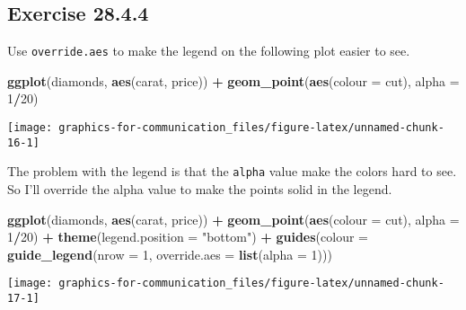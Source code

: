 \documentclass[]{book}
\newenvironment{Shaded}{\begin{snugshade}}{\end{snugshade}}
\newcommand{\DataTypeTok}[1]{\textcolor[rgb]{0.13,0.29,0.53}{#1}}
\newcommand{\DecValTok}[1]{\textcolor[rgb]{0.00,0.00,0.81}{#1}}
\newcommand{\KeywordTok}[1]{\textcolor[rgb]{0.13,0.29,0.53}{\textbf{#1}}}
\newcommand{\NormalTok}[1]{#1}
\newcommand{\OperatorTok}[1]{\textcolor[rgb]{0.81,0.36,0.00}{\textbf{#1}}}
\newcommand{\StringTok}[1]{\textcolor[rgb]{0.31,0.60,0.02}{#1}}
\theoremstyle{plain}
\theoremstyle{remark}
\theoremstyle{definition}
\theoremstyle{definition}
\theoremstyle{definition}
\theoremstyle{remark}
\begin{document}
\hypertarget{exercise-28.4.4}{%
\subsection*{\texorpdfstring{Exercise
{28.4.4}}{Exercise 28.4.4}}\label{exercise-28.4.4}}

Use \texttt{override.aes} to make the legend on the following plot
easier to see.

\begin{Shaded}
\begin{Highlighting}[]
\KeywordTok{ggplot}\NormalTok{(diamonds, }\KeywordTok{aes}\NormalTok{(carat, price)) }\OperatorTok{+}
\StringTok{  }\KeywordTok{geom_point}\NormalTok{(}\KeywordTok{aes}\NormalTok{(}\DataTypeTok{colour =}\NormalTok{ cut), }\DataTypeTok{alpha =} \DecValTok{1}\OperatorTok{/}\DecValTok{20}\NormalTok{)}
\end{Highlighting}
\end{Shaded}

\begin{center}\texttt{[image: graphics-for-communication\_files/figure-latex/unnamed-chunk-16-1]} \end{center}

The problem with the legend is that the \texttt{alpha} value make the
colors hard to see. So I'll override the alpha value to make the points
solid in the legend.

\begin{Shaded}
\begin{Highlighting}[]
\KeywordTok{ggplot}\NormalTok{(diamonds, }\KeywordTok{aes}\NormalTok{(carat, price)) }\OperatorTok{+}
\StringTok{  }\KeywordTok{geom_point}\NormalTok{(}\KeywordTok{aes}\NormalTok{(}\DataTypeTok{colour =}\NormalTok{ cut), }\DataTypeTok{alpha =} \DecValTok{1}\OperatorTok{/}\DecValTok{20}\NormalTok{)  }\OperatorTok{+}
\StringTok{  }\KeywordTok{theme}\NormalTok{(}\DataTypeTok{legend.position =} \StringTok{"bottom"}\NormalTok{) }\OperatorTok{+}
\StringTok{  }\KeywordTok{guides}\NormalTok{(}\DataTypeTok{colour =} \KeywordTok{guide_legend}\NormalTok{(}\DataTypeTok{nrow =} \DecValTok{1}\NormalTok{, }\DataTypeTok{override.aes =} \KeywordTok{list}\NormalTok{(}\DataTypeTok{alpha =} \DecValTok{1}\NormalTok{)))  }
\end{Highlighting}
\end{Shaded}

\begin{center}\texttt{[image: graphics-for-communication\_files/figure-latex/unnamed-chunk-17-1]} \end{center}
\end{document}
